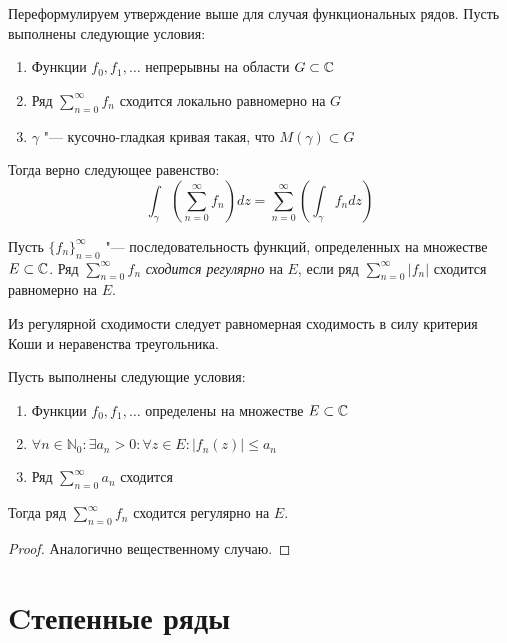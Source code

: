 \begin{note}
	Переформулируем утверждение выше для случая функциональных рядов. Пусть выполнены следующие условия:
	\begin{enumerate}
		\item Функции $f_0, f_1, \dotsc$ непрерывны на области $G \subset \mathbb{C}$
		\item Ряд $\sum_{n=0}^\infty f_n$ сходится локально равномерно на $G$
		\item $\gamma$ "--- кусочно-гладкая кривая такая, что $M(\gamma) \subset G$
	\end{enumerate}
	
	Тогда верно следующее равенство:
	\[\int_\gamma \left(\sum_{n=0}^\infty f_n\right)dz = \sum_{n=0}^\infty \left(\int_\gamma f_ndz\right)\]
\end{note}

\begin{definition}
	Пусть $\{f_n\}_{n = 0}^\infty$ "--- последовательность функций, определенных на множестве $E \subset \mathbb{C}$. Ряд $\sum_{n=0}^\infty f_n$ \textit{сходится регулярно} на $E$, если ряд $\sum_{n=0}^\infty |f_n|$ сходится равномерно на $E$.
\end{definition}

\begin{note}
	Из регулярной сходимости следует равномерная сходимость в силу критерия Коши и неравенства треугольника.
\end{note}

\begin{theorem}
	Пусть выполнены следующие условия:
	\begin{enumerate}
		\item Функции $f_0, f_1, \dotsc$ определены на множестве $E \subset \mathbb{C}$
		\item $\forall n \in \mathbb{N}_0 : \exists a_n > 0: \forall z \in E: |f_n(z)| \le a_n$
		\item Ряд $\sum_{n=0}^\infty a_n$ сходится
	\end{enumerate}
	
	Тогда ряд $\sum_{n=0}^\infty f_n$ сходится регулярно на $E$.
\end{theorem}

\begin{proof}
	Аналогично вещественному случаю.
\end{proof}

\section{Cтепенные ряды}

